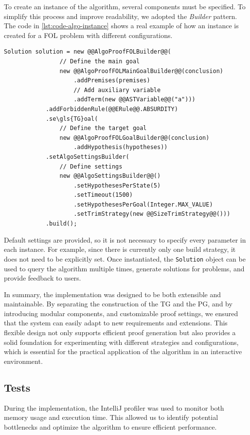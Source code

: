 To create an instance of the algorithm, several components must be specified. To simplify this process and improve readability, we adopted the \emph{Builder} pattern. The code in \autoref{lst:code-algo-instance} shows a real example of how an instance is created for a \gls{FOL} problem with different configurations.

\begin{lstlisting}[style=javastyle,
  caption={Example of an instantiation of the algorithm for a First-Order Logic problem with multiple configurations.},
  label={lst:code-algo-instance}]
            Solution solution = new @@AlgoProofFOLBuilder@@(
                // Define the main goal
                new @@AlgoProofFOLMainGoalBuilder@@(conclusion)
                    .addPremises(premises)
                    // Add auxiliary variable
                    .addTerm(new @@ASTVariable@@("a")))       
            .addForbiddenRule(@@ERule@@.ABSURDITY)
            .se\gls{TG}oal(
                // Define the target goal
                new @@AlgoProofFOLGoalBuilder@@(conclusion)
                    .addHypothesis(hypotheses))
            .setAlgoSettingsBuilder(
                // Define settings
                new @@AlgoSettingsBuilder@@()
                    .setHypothesesPerState(5)
                    .setTimeout(1500)
                    .setHypothesesPerGoal(Integer.MAX_VALUE)
                    .setTrimStrategy(new @@SizeTrimStrategy@@()))
            .build();
\end{lstlisting}

Default settings are provided, so it is not necessary to specify every parameter in each instance. For example, since there is currently only one build strategy, it does not need to be explicitly set. Once instantiated, the \texttt{Solution} object can be used to query the algorithm multiple times, generate solutions for problems, and provide feedback to users.

In summary, the implementation was designed to be both extensible and maintainable. By separating the construction of the \gls{TG} and the \gls{PG}, and by introducing modular components, and customizable proof settings, we ensured that the system can easily adapt to new requirements and extensions. This flexible design not only supports efficient proof generation but also provides a solid foundation for experimenting with different strategies and configurations, which is essential for the practical application of the algorithm in an interactive environment.

\subsection{Tests} 
During the implementation, the IntelliJ profiler was used to monitor both memory usage and execution time. This allowed us to identify potential bottlenecks and optimize the algorithm to ensure efficient performance.

